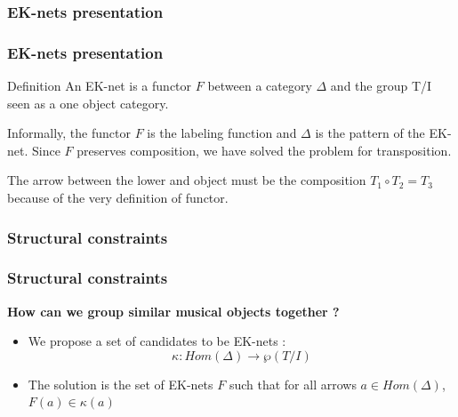 \documentclass{beamer}
\begin{document}
\subsubsection{EK-nets presentation}
\begin{frame}
	\frametitle{EK-nets presentation}
	\begin{block}{Definition}
		An EK-net is a functor $F$ between a category $\Delta$ and the group T/I seen as a one object category.
	\end{block}
	Informally, the functor $F$ is the labeling function and $\Delta$ is the pattern of the EK-net. Since $F$ preserves composition, we have solved the problem for transposition.


	\begin{figure}
		\centering

		\label{fig:KAminor}
	\end{figure}
	The arrow between the lower and object must be the composition $T_1\circ T_2 = T_3$ because of the very definition of functor.

\end{frame}

\subsubsection{Structural constraints}
\begin{frame}
	\frametitle{Structural constraints}
	\textbf{How can we group similar musical objects together ?}
	\begin{itemize}
		\item We propose a set of candidates to be EK-nets  : $$\kappa : Hom(\Delta) \rightarrow \wp(T/I)$$
		\item The solution is the set of EK-nets $F$ such that for all arrows $a\in Hom(\Delta)$, $F(a)\in\kappa(a)$
	\end{itemize}
\end{frame}
\end{document}
